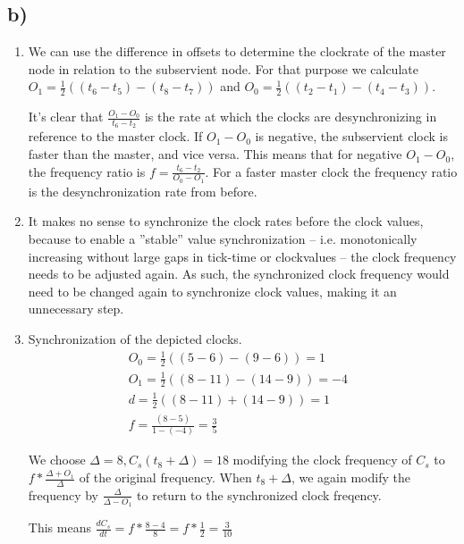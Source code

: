 \documentclass{scrartcl}
\begin{document}
\subsection*{b)}
\begin{enumerate}[label=(\roman*)]

	\item We can use the difference in offsets to determine the clockrate of the master node in relation to the subservient node.
	For that purpose we calculate \(O_1 = \frac12((t_6 - t_5) - (t_8 - t_7))\) and \(O_0 = \frac12((t_2 - t_1) - (t_4 - t_3))\).
	
	It's clear that \(\frac{O_1 - O_0}{t_6 - t_2}\) is the rate at which the clocks are desynchronizing in reference to the master clock.
	If \(O_1 - O_0\) is negative, the subservient clock is faster than the master, and vice versa.
	This means that for negative \(O_1 - O_0\), the frequency ratio is \(f = \frac{t_6 - t_2}{O_0 - O_1}\).
	For a faster master clock the frequency ratio is the desynchronization rate from before.

	\item It makes no sense to synchronize the clock rates before the clock values, because to enable a ''stable'' value synchronization  -- i.e. monotonically increasing without large gaps in tick-time or clockvalues -- the clock frequency needs to be adjusted again.
	As such, the synchronized clock frequency would need to be changed again to synchronize clock values, making it an unnecessary step.

	\item Synchronization of the depicted clocks.
	\begin{align*}
		O_0 = \frac12((5-6)-(9-6)) = 1 & \\
		O_1 = \frac12((8-11) - (14-9)) = -4 & \\
		d = \frac12((8-11) + (14-9)) = 1 & \\
		f = \frac{(8 - 5)}{1 - (-4)} = \frac35 &
	\end{align*}

	We choose \(\Delta = 8, C_s(t_8 + \Delta) = 18\) modifying the clock frequency of \(C_s\) to \(f * \frac{\Delta + O_1}{\Delta}\) of the original frequency.
	When \(t_8 + \Delta\), we again modify the frequency by \(\frac{\Delta}{\Delta - O_1}\) to return to the synchronized clock freqency.
	
	This means \(\frac{dC_s}{dt} = f * \frac{8 - 4}{8} = f * \frac12 = \frac{3}{10}\)


\end{enumerate}
\end{document}
